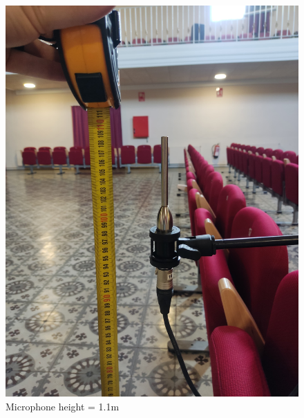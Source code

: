 \begin{figure}[H]
	\centering
	\includegraphics[width=0.8
	\linewidth]{Figures/Coro_micpos2.jpeg}
	\caption{Microphone height = 1.1m}
	\label{fig:Mic_pos2}
\end{figure}

